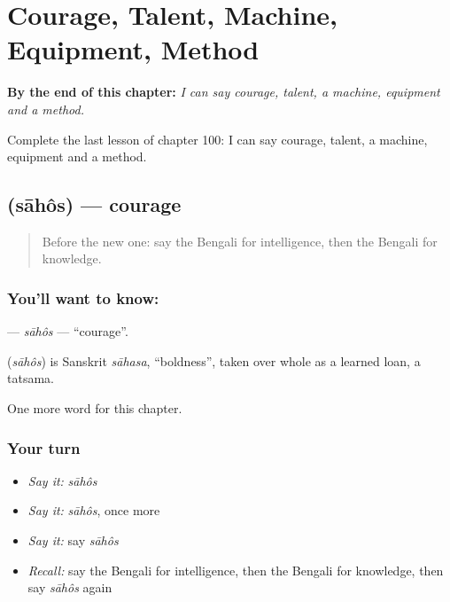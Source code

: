 
\chapter{Courage, Talent, Machine, Equipment, Method}
\label{ch:bn-courage-talent-machine-equipment-method}

\begin{chapteropening}
\textbf{By the end of this chapter:} \emph{I can say courage, talent, a machine, equipment and a method.}

Complete the last lesson of chapter 100: I can say courage, talent, a machine, equipment and a method.
\end{chapteropening}

\section[\texorpdfstring{\bn{সাহস} (sāhôs)}{সাহস (sāhôs)}]{ (sāhôs) — courage}

\label{lesson:BN-C100-sahos}



\begin{quote}
Before the new one: say the Bengali for intelligence, then the Bengali for knowledge.
\end{quote}

\subsection*{You'll want to know: }
\textbf{} — \emph{sāhôs} — \textquotedblleft{}courage\textquotedblright{}.

\begin{cousinweb}
\textbf{} (\emph{sāhôs}) is Sanskrit \emph{sāhasa}, \textquotedblleft{}boldness\textquotedblright{}, taken over whole as a learned loan, a tatsama.
\end{cousinweb}

\begin{grammarlens}[title={What you've built}]
One more word for this chapter.
\end{grammarlens}

\subsection*{Your turn}
\begin{itemize}
\raggedright
  \item \emph{Say it:} \emph{sāhôs}
  \item \emph{Say it:} \emph{sāhôs}, once more
  \item \emph{Say it:} say \emph{sāhôs}
  \item \emph{Recall:} say the Bengali for intelligence, then the Bengali for knowledge, then say \emph{sāhôs} again
\end{itemize}

